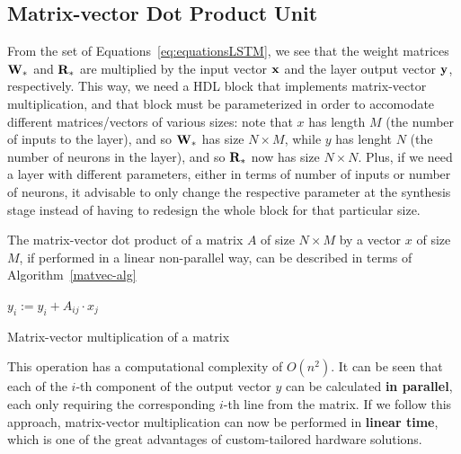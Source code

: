 \subsection{Matrix-vector Dot Product Unit}\label{sec:dotprod_sec}
From the set of Equations~\ref{eq:equationsLSTM}, we see that the weight matrices $\mathbf{W}_*$ and $\mathbf{R}_*$ are multiplied by the input vector $\mathbf{x}$ and the layer output vector $\mathbf{y}$, respectively. This way, we need a HDL block that implements matrix-vector multiplication, and that block must be parameterized in order to accomodate different matrices/vectors of various sizes: note that $x$ has length $M$ (the number of inputs to the layer), and so $\mathbf{W}_*$ has size $N\times M$, while $y$ has lenght $N$ (the number of neurons in the layer), and so $\mathbf{R}_*$ now has size $N\times N$. Plus, if we need a layer with different parameters, either in terms of number of inputs or number of neurons, it advisable to only change the respective parameter at the synthesis stage instead of having to redesign the whole block for that particular size. 

The matrix-vector dot product of a matrix $A$ of size $N \times M$ by a vector $x$ of size $M$, if performed in a linear non-parallel way, can be described in terms of Algorithm~\ref{matvec-alg}

\begin{algorithm}
\begin{algorithmic}
    \State $y_i := y_i + A_{ij} \cdot x_j$
    \EndFor
\EndFor
\end{algorithmic}
\caption{Matrix-vector multiplication of a matrix}
\label{matvec-alg}
\end{algorithm}
This operation has a computational complexity of $O(n^2)$. It can be seen that each of the $i$-th component of the output vector $y$ can be calculated \textbf{in parallel}, each only requiring the corresponding $i$-th line from the matrix. If we follow this approach, matrix-vector multiplication can now be performed in \textbf{linear time}, which is one of the great advantages of custom-tailored hardware solutions. 

